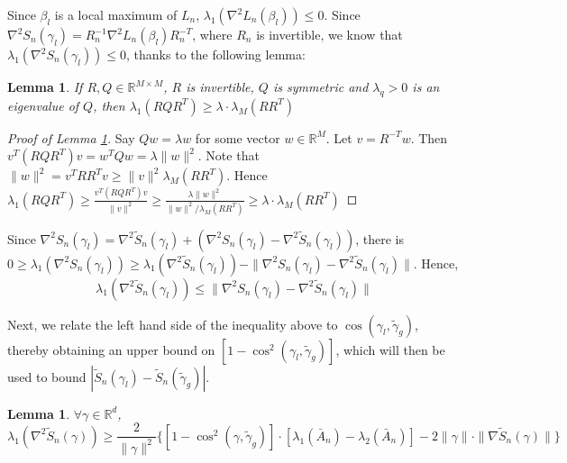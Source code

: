 \documentclass{article} \usepackage{iclr2019_conference,times}
\newtheorem{lemma}[theorem]{Lemma}
\begin{document}
Since $\beta_l$ is a local maximum of $L_n$, $\lambda_{1}(\nabla^2 L_n(\beta_l)) \leq 0$. Since $\nabla^2 S_n(\gamma_l) = R_n^{-1} \nabla^2 L_n(\beta_l) R_n^{-T}$, where $R_n$ is invertible, we know that $\lambda_{1}(\nabla^2 S_n(\gamma_l)) \leq 0$, thanks to the following lemma:

\begin{lemma}
\label{change_of_var}
If $R, Q \in \mathbb{R}^{M \times M}$, $R$ is invertible, $Q$ is symmetric and $\lambda_q > 0$ is an eigenvalue of $Q$, then $\lambda_{1} (R Q R^T) \geq \lambda \cdot \lambda_{M}(RR^T)$
\end{lemma}

\begin{proof}[Proof of Lemma \ref{change_of_var}]
Say $Q w = \lambda w$ for some vector $w \in \mathbb{R}^M$. Let $v = R^{-T} w$. Then $v^T (R Q R^T) v = w^T Q w = \lambda \| w \|^2$. Note that $\| w \|^2 = v^T R R^T v \geq \| v \|^2 \lambda_M(R R^T)$.
Hence
$\lambda_{1} (R Q R^T) \geq \frac{v^T (R Q R^T) v}{\| v \|^2} \geq \frac{\lambda \| w \|^2}{\| w \|^2 / \lambda_M(R R^T)} \geq \lambda \cdot \lambda_{M}(RR^T)$
\end{proof}

Since \(\nabla^2 S_n(\gamma_l) = \nabla^2 \tilde{S}_n(\gamma_l) + (\nabla^2 S_n(\gamma_l) - \nabla^2 \tilde{S}_n(\gamma_l))\), there is \(0 \geq \lambda_{1}(\nabla^2 S_n(\gamma_l)) \geq \lambda_{1}(\nabla^2 \tilde{S}_n(\gamma_l)) - \|\nabla^2 S_n(\gamma_l) - \nabla^2 \tilde{S}_n(\gamma_l)\|\).
Hence,
\begin{equation}
\label{first_ineq}
\lambda_{1}(\nabla^2 \tilde{S}_n(\gamma_l)) \leq \|\nabla^2 S_n(\gamma_l) - \nabla^2 \tilde{S}_n(\gamma_l)\|
\end{equation}





Next, we relate the left hand side of the inequality above to $\cos(\gamma_l, \tilde{\gamma}_g)$, thereby obtaining an upper bound on $[1 - \cos^2(\gamma_l, \tilde{\gamma}_g)]$, which will then be used to bound $|\tilde{S}_n(\gamma_l) - \tilde{S}_n(\tilde{\gamma}_g)|$.

\begin{lemma} \label{bound_noiseless_hessian}
$\forall \gamma \in \mathbb{R}^d$,
\[\lambda_{1}(\nabla^2 \tilde{S}_n(\gamma)) \geq \frac{2}{\| \gamma \|^2}\{[1 - \cos^2(\gamma, \tilde{\gamma}_g)] \cdot [\lambda_1(\bar{A}_n) - \lambda_2(\bar{A}_n)] - 2 \| \gamma\| \cdot \| \nabla \tilde{S}_n(\gamma) \|\}
\]
\end{lemma}
\end{document}
